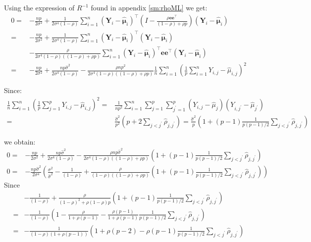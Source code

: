 \documentclass[12pt]{article}
\newcommand\Ve{\mathbf{e}}
\newcommand\VY{\mathbf{Y}}
\newcommand\Vmu{\boldsymbol{\mu}}
\newcommand\trans[1]{{#1}^\intercal}%
\begin{document}
Using the expression of \(R^{-1}\) found in appendix \ref{sm:rhoML} we get:
\begin{align*}
0 =&-\frac{np}{2 \sigma^2} + \frac{1}{2 \sigma^4(1- \rho)} \sum_{i=1}^n \trans{(\VY_i-\widehat{\Vmu}_i)} \left(I - \frac{\rho \Ve\trans{\Ve}}{(1-\rho)+\rho p} \right) (\VY_i-\widehat{\Vmu}_i) \\ 
  =&-\frac{np}{2 \sigma^2} + \frac{1}{2 \sigma^4(1- \rho)} \sum_{i=1}^n \trans{(\VY_i-\widehat{\Vmu}_i)}(\VY_i-\widehat{\Vmu}_i) \\ & - \frac{\rho}{2 \sigma^4(1- \rho)((1-\rho)+\rho p)} \sum_{i=1}^n \trans{(\VY_i-\widehat{\Vmu}_i)}\Ve\trans{\Ve}(\VY_i-\widehat{\Vmu}_i)  \\ 
  =&-\frac{np}{2 \sigma^2} + \frac{np\widehat{\sigma}^2}{2 \sigma^4(1- \rho)} - \frac{\rho n p^2}{2 \sigma^4(1- \rho)((1-\rho)+\rho p)} \frac{1}{n}\sum_{i=1}^n \left(\frac{1}{p} \sum_{i=1}^n Y_{i,j} - \widehat{\mu}_{i,j} \right)^2 
\end{align*}

Since:
\begin{align*}
\frac{1}{n} \sum_{i=1}^n \left(\frac{1}{p}\sum_{j=1}^p Y_{i,j}-\widehat{\mu}_{i,j}\right)^2=& \frac{1}{np^2} \sum_{i=1}^n \sum_{j=1}^p \sum_{j^{\prime}=1}^p \left(Y_{i,j}-\widehat{\mu}_j\right)\left(Y_{i,j^{\prime}}-\widehat{\mu}_{j^{\prime}}\right) \\
=&  \frac{\widehat{\sigma}^2}{p^2} \left(p + 2\sum_{j < j^{\prime}}\widehat{\rho}_{j,j^{\prime}}\right)  = \frac{\widehat{\sigma}^2}{p} \left(1 + (p-1)\frac{1}{p(p-1)/2}\sum_{j < j^{\prime}}\widehat{\rho}_{j,j^{\prime}}\right) 
\end{align*}

we obtain:
\begin{align*}
0 =&-\frac{np}{2 \sigma^2} + \frac{np\widehat{\sigma}^2}{2 \sigma^4(1- \rho)} - \frac{\rho n p \widehat{\sigma}^2}{2 \sigma^4(1- \rho)((1-\rho)+\rho p)} \left(1 + (p-1)\frac{1}{p(p-1)/2}\sum_{j < j^{\prime}}\widehat{\rho}_{j,j^{\prime}}\right) \\
0 =&-\frac{np \widehat{\sigma}^2}{2 \sigma^4}\left(\frac{\sigma^2}{\widehat{\sigma}^2} - \frac{1}{(1- \rho)} + \frac{\rho }{(1- \rho)((1-\rho)+\rho p)} \left(1 + (p-1)\frac{1}{p(p-1)/2}\sum_{j < j^{\prime}}\widehat{\rho}_{j,j^{\prime}}\right)\right)  
\end{align*}
Since
\begin{align*}
& - \frac{1}{(1- \rho)}  + \frac{\rho}{(1-\rho)^2+\rho(1-\rho)p} \left(1 + (p-1)\frac{1}{p(p-1)/2}\sum_{j < j^{\prime}}\widehat{\rho}_{j,j^{\prime}}\right) \\
=& - \frac{1}{(1- \rho)}\left(1  - \frac{\rho}{1+\rho(p-1)} - \frac{\rho(p-1)}{1+\rho(p-1)}\frac{1}{p(p-1)/2}\sum_{j < j^{\prime}}\widehat{\rho}_{j,j^{\prime}}\right) \\
=&  -\frac{1}{(1- \rho)(1+\rho(p-1))}\left(1 + \rho (p-2) - \rho(p-1)\frac{1}{p(p-1)/2}\sum_{j < j^{\prime}}\widehat{\rho}_{j,j^{\prime}}\right) 
\end{align*}
\end{document}
